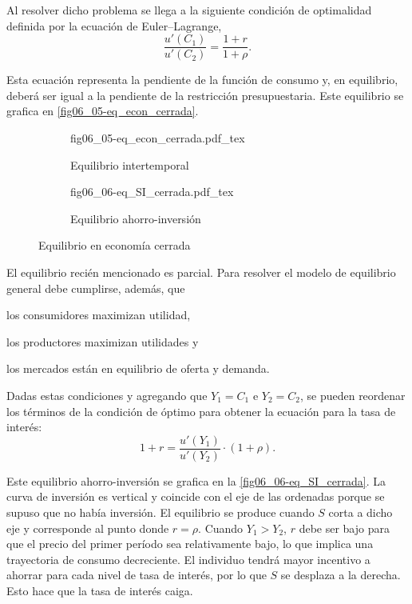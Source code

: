 \documentclass[DeGregorioResumen]{subfiles}
\begin{document}
Al resolver dicho problema se llega a la siguiente condición de optimalidad definida por la ecuación de Euler--Lagrange,
\begin{equation}
	\frac{u'(C_1)}{u'(C_2)} = \frac{1+r}{1+\rho}.
	\label{eq:06-euler_lagrange}
\end{equation}

Esta ecuación representa la pendiente de la función de consumo y, en equilibrio, deberá ser igual a la pendiente de la restricción presupuestaria. Este equilibrio se grafica en \autoref{fig06_05-eq_econ_cerrada}.

\begin{figure}[h]
\captionsetup[subfigure]{aboveskip=20pt,belowskip=15pt}
\centering
\begin{subfigure}{.45\textwidth}
  \centering
        \def\svgwidth{\textwidth}
        {fig06_05-eq_econ_cerrada.pdf_tex}
  \caption{Equilibrio intertemporal}
  \label{fig06_05-eq_econ_cerrada}
\end{subfigure}\hspace{.05\textwidth}
\begin{subfigure}{.45\textwidth}
  \centering
        \def\svgwidth{\textwidth}
        {fig06_06-eq_SI_cerrada.pdf_tex}
  \caption{Equilibrio ahorro-inversión}
  \label{fig06_06-eq_SI_cerrada}
\end{subfigure}
\caption{Equilibrio en economía cerrada}
\label{fig06-equilibrio_economia_cerrada}
\end{figure}

El equilibrio recién mencionado es parcial. Para resolver el modelo de equilibrio general debe cumplirse, además, que 
\begin{enumerate*}[label=(\roman*)]
\item los consumidores maximizan utilidad,
\item los productores maximizan utilidades y
\item los mercados están en equilibrio de oferta y demanda.
\end{enumerate*}
Dadas estas condiciones y agregando que $Y_1=C_1$ e $Y_2=C_2$, se pueden reordenar los términos de la condición de óptimo para obtener la ecuación para la tasa de interés:
\begin{equation}
	1+r = \frac{u'(Y_1)}{u'(Y_2)}\cdot (1+\rho).
\end{equation}

Este equilibrio ahorro-inversión se grafica en la \autoref{fig06_06-eq_SI_cerrada}. La curva de inversión es vertical y coincide con el eje de las ordenadas porque se supuso que no había inversión. El equilibrio se produce cuando $S$ corta a dicho eje y corresponde al punto donde $r=\rho $. Cuando $Y_1>Y_2$, $r$ debe ser bajo para que el precio del primer período sea relativamente bajo, lo que implica una trayectoria de consumo decreciente. El individuo tendrá mayor incentivo a ahorrar para cada nivel de tasa de interés, por lo que $S$ se desplaza a la derecha. Esto hace que la tasa de interés caiga.
\end{document}
